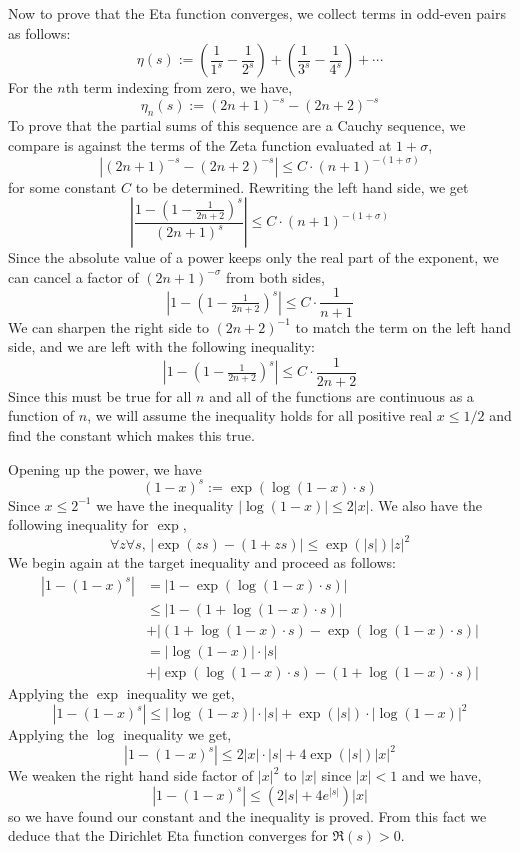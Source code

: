 \documentclass[12pt,reqno]{amsart}
\numberwithin{equation}{section}
\begin{document}
Now to prove that the Eta function converges, we collect terms in odd-even pairs as follows:
\[
    \eta(s) := \left(\frac{1}{1^s} - \frac{1}{2^s}\right) + \left(\frac{1}{3^s} - \frac{1}{4^s}\right) + \cdots
\]
For the $n$th term indexing from zero, we have,
\[
    \eta_n(s) := (2n+1)^{-s} - (2n+2)^{-s}
\]
To prove that the partial sums of this sequence are a Cauchy sequence, we compare is against the terms of the Zeta function evaluated at $1 + \sigma$,
\[
    \left|(2n+1)^{-s} - (2n+2)^{-s} \right| \leq C \cdot (n+1) ^ {-(1 + \sigma)}
\]
for some constant $C$ to be determined. Rewriting the left hand side, we get
\[
    \left| \frac{1 - (1 - \tfrac{1}{2n+2})^s}{(2n+1)^s} \right| \leq C\cdot(n+1)^{-(1+\sigma)}
\]
Since the absolute value of a power keeps only the real part of the exponent, we can cancel a factor of $(2n+1)^{-\sigma}$ from both sides,
\[
    \left|1 - (1 - \tfrac{1}{2n+2})^s\right| \leq C\cdot \frac{1}{n+1}
\]
We can sharpen the right side to $(2n+2)^{-1}$ to match the term on the left hand side, and we are left with the following inequality:
\[
    \left|1 - (1 - \tfrac{1}{2n+2})^s\right| \leq C\cdot \frac{1}{2n+2}
\]
Since this must be true for all $n$ and all of the functions are continuous as a function of $n$, we will assume the inequality holds for all positive real $x \leq 1/2$ and find the constant which makes this true.

Opening up the power, we have
\[
    (1 - x)^s := \exp(\log(1 - x) \cdot s)
\]
Since $x \leq 2^{-1}$ we have the inequality $|\log(1 - x)| \leq 2|x|$. We also have the following inequality for $\exp$,
\[
    \forall z\forall s,\,\left|\exp(zs) - (1 + zs)\right| \leq \exp(|s|) |z|^2 
\]
We begin again at the target inequality and proceed as follows:
\begin{align*}
\left|1 - (1 - x) ^ s \right|
    &= \left| 1 - \exp(\log(1 - x) \cdot s) \right| \\
    &\leq \left| 1 - (1 + \log(1 - x) \cdot s) \right| \\
    &+ \left| (1 + \log (1 - x) \cdot s) - \exp(\log(1 - x) \cdot s) \right| \\
    &= \left|\log(1 - x)\right| \cdot |s| \\
    &+ \left| \exp(\log(1 - x) \cdot s) - (1 + \log(1 - x)\cdot s)\right|
\end{align*}
Applying the $\exp$ inequality we get,
\[
    \left|1 - (1 - x)^s\right| \leq \left|\log(1 - x)\right|\cdot|s| + \exp(|s|) \cdot \left|\log(1 - x)\right|^2
\]
Applying the $\log$ inequality we get,
\[
    \left|1 - (1 - x)^s\right| \leq 2|x|\cdot|s| + 4\exp(|s|)|x|^2
\]
We weaken the right hand side factor of $|x|^2$ to $|x|$ since $|x| < 1$ and we have,
\[
    \left|1 - (1 - x)^s\right| \leq (2|s| + 4e^{|s|}) |x|
\]
so we have found our constant and the inequality is proved. From this fact we deduce that the Dirichlet Eta function converges for $\Re(s) > 0$.
\end{document}

